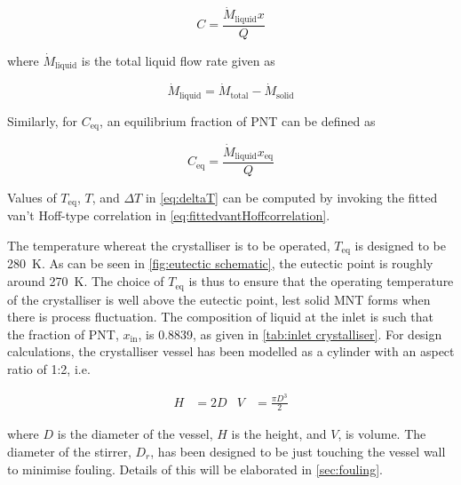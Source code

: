 \begin{equation}
    C = \frac{\dot{M}_{\mathrm{liquid}} x}{Q}
\end{equation}

\noindent where $\dot{M}_{\mathrm{liquid}}$ is the total liquid flow rate given as 

\begin{equation}
    \dot{M}_{\mathrm{liquid}} = \dot{M}_{\mathrm{total}} - \dot{M}_{\mathrm{solid}}
\end{equation}

\noindent Similarly, for $C_{\mathrm{eq}}$, an equilibrium fraction of PNT can be defined as

\begin{equation}
    C_{\mathrm{eq}} = \frac{\dot{M}_{\mathrm{liquid}} x_{\mathrm{eq}}}{Q}
\end{equation}

\noindent Values of $T_{\mathrm{eq}}$, $T$, and $\Delta T$ in \cref{eq:deltaT} can be computed by invoking the fitted van't Hoff-type correlation in \cref{eq:fittedvantHoffcorrelation}. 

The temperature whereat the crystalliser is to be operated, $T_{\mathrm{eq}}$ is designed to be \SI{280}{\K}. As can be seen in \cref{fig:eutectic schematic}, the eutectic point is roughly around \SI{270}{\K}. The choice of $T_{\mathrm{eq}}$ is thus to ensure that the operating temperature of the crystalliser is well above the eutectic point, lest solid MNT forms when there is process fluctuation. The composition of liquid at the inlet is such that the fraction of PNT, $x_{\mathrm{in}}$, is 0.8839, as given in \cref{tab:inlet crystalliser}. For design calculations, the crystalliser vessel has been modelled as a cylinder with an aspect ratio of 1:2, i.e. 

\begin{align}
        H &= 2D &
        V &= \frac{\pi D^3}{2} 
\end{align}


\noindent where $D$ is the diameter of the vessel, $H$ is the height, and $V$, is volume. The diameter of the stirrer, $D_r$, has been designed to be just touching the vessel wall to minimise fouling. Details of this will be elaborated in \cref{sec:fouling}.


